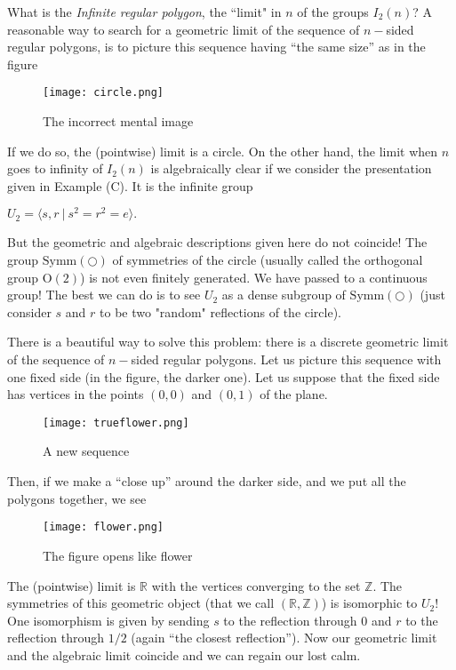 \documentclass[12pt]{wart}
\theoremstyle{remark}
\begin{document}
What is the \emph{Infinite regular polygon},  the ``limit" in $n$ of the groups $I_2(n)$? A reasonable way to search for a geometric  limit of the sequence of $n-$sided regular polygons, is to picture this sequence having ``the same size'' as in the figure
 \begin{figure}[H] 
 \texttt{[image: circle.png]} 
\caption{The incorrect mental image}  
\end{figure} 
If we do so, the (pointwise) limit is a circle. On the other hand, the limit when $n$ goes to infinity of $I_2(n)$ is algebraically clear if we consider  the presentation given in Example (C). It is the infinite group 

\begin{description}
\item \hspace{4cm} $ U_2=\langle s, r\ \vert \ s^2=r^2=e\rangle.$

\end{description} 

 But the geometric and algebraic descriptions given here do not coincide! The group $\mathrm{Symm}(\bigcirc)$ of symmetries of the circle (usually called the orthogonal group $\mathrm{O}(2)$) is not even finitely generated. We have passed to a continuous group! The best we can do is to see $  U_2$ as a dense subgroup of  $\mathrm{Symm}(\bigcirc)$ (just consider $s$ and $r$ to be two "random" reflections of the circle). 

There is a beautiful way to solve this problem: there is a discrete   geometric  limit of the sequence of $n-$sided regular polygons. Let us picture this sequence with one fixed side (in the figure, the darker one). Let us suppose that the fixed side has vertices in the points $(0,0)$ and $(0,1)$ of the plane.  
 \begin{figure}[H] 
 \texttt{[image: trueflower.png]} 
\caption{A new sequence}  

\end{figure} 
Then, if we make a ``close up'' around the darker side, and we put all the polygons together, we see
 \begin{figure}[H] 
 \texttt{[image: flower.png]} 
\caption{The figure opens like flower}  

\end{figure} 
The (pointwise) limit is $\mathbb{R}$ with the vertices converging to the set $\mathbb{Z}$. The symmetries of this geometric object (that we call $(\mathbb{R}, \mathbb{Z})$) is isomorphic to $U_2$! One isomorphism is given by sending $s$ to the reflection through $0$ and $r$ to the reflection through $1/2$ (again ``the closest reflection''). Now our geometric limit and the algebraic limit coincide and we can regain our lost calm. 
\end{document}
